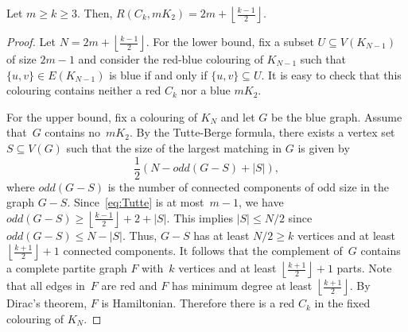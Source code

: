 \documentclass[10pt,a4paper]{amsart}
\newcommand*{\floorfrac}[2]{\mathopen{}\left\lfloor\frac{#1}{#2}\right\rfloor\mathclose{}}
\begin{document}
\begin{proposition}\label{proposition:matching}
    Let $m \ge k \geq 3$. 
    Then, $R(C_k,mK_2) = 2m + \floorfrac{k-1}{2} $.
\end{proposition}

\begin{proof}
    Let $N = 2m +\floorfrac{k-1}{2}$.
    For the lower bound, fix a subset $U \subseteq V(K_{N-1})$ of size $2m-1$ and consider the red-blue colouring of $K_{N-1}$ such that $\{u, v\} \in E(K_{N-1})$ is blue if and only if $\{u, v\} \subseteq U$.
    It is easy to check that this colouring contains neither a red $C_k$ nor a blue $mK_2$.

    For the upper bound, fix a colouring of $K_N$ and let $G$ be the blue graph.
    Assume that~$G$ contains no~$mK_2$.
    By the Tutte-Berge formula, there exists a vertex set $S\subseteq V(G)$ such that the size of the largest matching in $G$ is given by 
    \begin{equation}\label{eq:Tutte}
        \frac{1}{2}\left( N - odd(G - S) + |S| \right),    
    \end{equation} 
    where $odd(G-S)$ is the number of connected components of odd size in the graph $G - S$.
    Since~\eqref{eq:Tutte} is at most~$m-1$, we have $odd(G-S)\ge\floorfrac{k-1}{2} + 2+|S|$.
    This implies $|S|\le N/2$ since $odd(G-S)\le N-|S|$.
    Thus, $G-S$ has at least $N/2\ge k$ vertices and at least $\floorfrac{k+1}{2} + 1$ connected components.
    It follows that the complement of~$G$ contains a complete partite graph $F$ with~$k$ vertices and at least $\floorfrac{k+1}{2} + 1$ parts.
    Note that all edges in~$F$ are red and $F$ has minimum degree at least $\floorfrac{k+1}{2}$.
    By Dirac's theorem, $F$ is Hamiltonian.
    Therefore there is a red $C_k$ in the fixed colouring of $K_N$. 
\end{proof}
\end{document}
